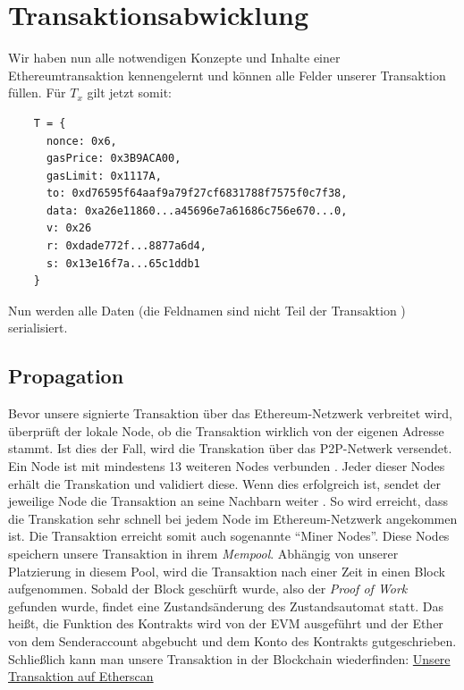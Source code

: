 \documentclass[runningheads]{llncs}
\begin{document}
\section{Transaktionsabwicklung}
Wir haben nun alle notwendigen Konzepte und Inhalte einer Ethereumtransaktion kennengelernt und können alle Felder unserer Transaktion füllen. Für $T_x$ gilt jetzt somit:
\begin{center}
  \begin{verbatim}
    T = { 
      nonce: 0x6,
      gasPrice: 0x3B9ACA00,
      gasLimit: 0x1117A,
      to: 0xd76595f64aaf9a79f27cf6831788f7575f0c7f38,
      data: 0xa26e11860...a45696e7a61686c756e670...0,
      v: 0x26
      r: 0xdade772f...8877a6d4,
      s: 0x13e16f7a...65c1ddb1
    }
  \end{verbatim}
\end{center}
Nun werden alle Daten (die Feldnamen sind nicht Teil der Transaktion \cite[S. 100]{antonopoulos_mastering_2019}) serialisiert.
\subsection{Propagation}
Bevor unsere signierte Transaktion über das Ethereum-Netzwerk verbreitet wird, überprüft der lokale Node, ob die Transaktion wirklich von der eigenen Adresse stammt. Ist dies der Fall, wird die Transkation über das P2P-Netwerk versendet. Ein Node ist mit mindestens 13 weiteren Nodes verbunden \cite[S. 123]{antonopoulos_mastering_2019}. Jeder dieser Nodes erhält die Transkation und validiert diese. Wenn dies erfolgreich ist, sendet der jeweilige Node die Transaktion an seine Nachbarn weiter \cite[S. 123]{antonopoulos_mastering_2019}. So wird erreicht, dass die Transkation sehr schnell bei jedem Node im Ethereum-Netzwerk angekommen ist. Die Transaktion erreicht somit auch sogenannte "`Miner Nodes"'. Diese Nodes speichern unsere Transaktion in ihrem \textit{Mempool}. Abhängig von unserer Platzierung in diesem Pool, wird die Transaktion nach einer Zeit in einen Block aufgenommen. Sobald der Block geschürft wurde, also der \textit{Proof of Work} gefunden wurde, findet eine Zustandsänderung des Zustandsautomat statt. Das heißt, die Funktion des Kontrakts wird von der EVM ausgeführt und der Ether von dem Senderaccount abgebucht und dem Konto des Kontrakts gutgeschrieben. Schließlich kann man unsere Transaktion in der Blockchain wiederfinden: \href{https://ropsten.etherscan.io/tx/0x6c5cd70f3464a6b68f95ba1bb7ebb5ece5a2f1ab4d45a5bb068e727e08fa827d}{Unsere Transaktion auf Etherscan}
\end{document}
